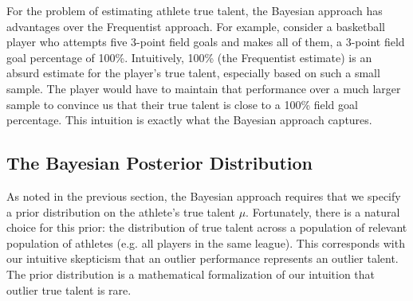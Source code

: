 \documentclass{article}
\begin{document}
    For the problem of estimating athlete true talent, the Bayesian approach has advantages over the Frequentist approach. For example, consider a basketball player who attempts five 3-point field goals and makes all of them, a 3-point field goal percentage of 100\%. Intuitively, 100\% (the Frequentist estimate) is an absurd estimate for the player's true talent, especially based on such a small sample. The player would have to maintain that performance over a much larger sample to convince us that their true talent is close to a 100\% field goal percentage. This intuition is exactly what the Bayesian approach captures.

  \subsection{\sc The Bayesian Posterior Distribution}

    As noted in the previous section, the Bayesian approach requires that we specify a prior distribution on the athlete's true talent $\mu$. Fortunately, there is a natural choice for this prior: the distribution of true talent across a population of relevant population of athletes (e.g. all players in the same league). This corresponds with our intuitive skepticism that an outlier performance represents an outlier talent. The prior distribution is a mathematical formalization of our intuition that outlier true talent is rare.
\end{document}

